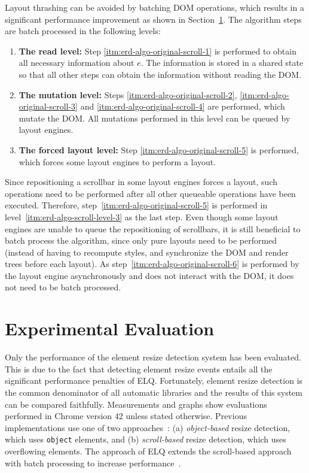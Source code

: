 \documentclass[sigconf,9pt]{acmart}
\newcommand{\elq}{ELQ}
\begin{document}
    Layout thrashing can be avoided by batching DOM operations, which results in a significant performance improvement as shown in Section~\ref{sec:eval}.
    The algorithm steps are batch processed in the following levels:
    \begin{enumerate}
      \item\label{itm:erd-algo-scroll-level-1}
        \textbf{The read level:}
        Step \ref{itm:erd-algo-original-scroll-1} is performed to obtain all necessary information about $e$.
        The information is stored in a shared state so that all other steps can obtain the information without reading the DOM.
      \item\label{itm:erd-algo-scroll-level-2}
        \textbf{The mutation level:}
        Steps \ref{itm:erd-algo-original-scroll-2}, \ref{itm:erd-algo-original-scroll-3} and \ref{itm:erd-algo-original-scroll-4} are performed, which mutate the DOM.
        All mutations performed in this level can be queued by layout engines.
      \item\label{itm:erd-algo-scroll-level-3}
        \textbf{The forced layout level:}
        Step \ref{itm:erd-algo-original-scroll-5} is performed, which forces some layout engines to perform a layout.
    \end{enumerate}

    Since repositioning a scrollbar in some layout engines forces a layout, such operations need to be performed after all other queueable operations have been executed.
    Therefore, step~\ref{itm:erd-algo-original-scroll-5} is performed in level~\ref{itm:erd-algo-scroll-level-3} as the last step.
    Even though some layout engines are unable to queue the repositioning of scrollbars, it is still beneficial to batch process the algorithm, since only pure layouts need to be performed (instead of having to recompute styles, and synchronize the DOM and render trees before each layout).
    As step~\ref{itm:erd-algo-original-scroll-6} is performed by the layout engine asynchronously and does not interact with the DOM, it does not need to be batch processed.

  \section{Experimental Evaluation}\label{sec:eval}
    Only the performance of the element resize detection system has
    been evaluated.  This is due to the fact that detecting element
    resize events entails all the significant performance penalties of
    \elq{}.  Fortunately, element resize detection is the common
    denominator of all automatic libraries and the results of this
    system can be compared faithfully.  Measurements and graphs show
    evaluations performed in Chrome version 42 unless stated
    otherwise.  Previous implementations use one of two
    approaches~\cite{backalley}: (a) {\em object-based} resize
    detection, which uses \verb|object| elements, and (b) {\em
      scroll-based} resize detection, which uses overflowing elements.
    The approach of \elq{} extends the scroll-based approach with
    batch processing to increase performance~\cite{WienerEH15}.
\end{document}
